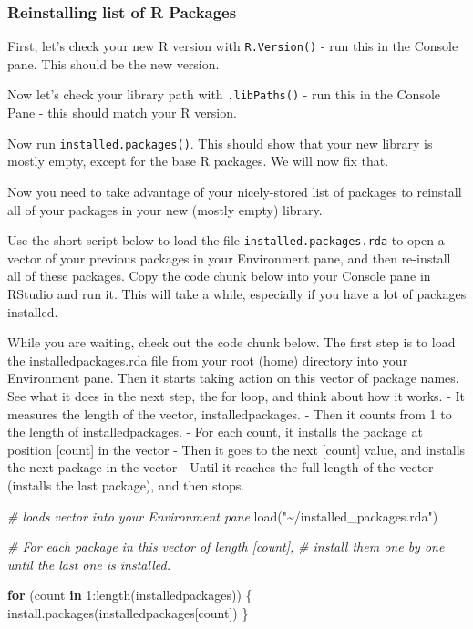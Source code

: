 \documentclass[
]{book}
\newenvironment{Shaded}{\begin{snugshade}}{\end{snugshade}}
\newcommand{\CommentTok}[1]{\textcolor[rgb]{0.56,0.35,0.01}{\textit{#1}}}
\newcommand{\ControlFlowTok}[1]{\textcolor[rgb]{0.13,0.29,0.53}{\textbf{#1}}}
\newcommand{\DecValTok}[1]{\textcolor[rgb]{0.00,0.00,0.81}{#1}}
\newcommand{\FunctionTok}[1]{\textcolor[rgb]{0.00,0.00,0.00}{#1}}
\newcommand{\NormalTok}[1]{#1}
\newcommand{\SpecialCharTok}[1]{\textcolor[rgb]{0.00,0.00,0.00}{#1}}
\newcommand{\StringTok}[1]{\textcolor[rgb]{0.31,0.60,0.02}{#1}}
\begin{document}
\hypertarget{reinstalling-list-of-r-packages}{%
\subsubsection{Reinstalling list of R Packages}\label{reinstalling-list-of-r-packages}}

First, let's check your new R version with \texttt{R.Version()} - run this in the Console pane. This should be the new version.

Now let's check your library path with \texttt{.libPaths()} - run this in the Console Pane - this should match your R version.

Now run \texttt{installed.packages()}. This should show that your new library is mostly empty, except for the base R packages. We will now fix that.

Now you need to take advantage of your nicely-stored list of packages to reinstall all of your packages in your new (mostly empty) library.

Use the short script below to load the file \texttt{installed.packages.rda} to open a vector of your previous packages in your Environment pane, and then re-install all of these packages. Copy the code chunk below into your Console pane in RStudio and run it. This will take a while, especially if you have a lot of packages installed.

While you are waiting, check out the code chunk below. The first step is to load the installedpackages.rda file from your root (home) directory into your Environment pane. Then it starts taking action on this vector of package names. See what it does in the next step, the for loop, and think about how it works. - It measures the length of the vector, installedpackages. - Then it counts from 1 to the length of installedpackages. - For each count, it installs the package at position {[}count{]} in the vector - Then it goes to the next {[}count{]} value, and installs the next package in the vector - Until it reaches the full length of the vector (installs the last package), and then stops.

\begin{Shaded}
\begin{Highlighting}[]
\CommentTok{\# loads vector into your Environment pane}
\FunctionTok{load}\NormalTok{(}\StringTok{"\textasciitilde{}/installed\_packages.rda"}\NormalTok{)}

\CommentTok{\# For each package in this vector of length [count],}
\CommentTok{\# install them one by one until the last one is installed.}

\ControlFlowTok{for}\NormalTok{ (count }\ControlFlowTok{in} \DecValTok{1}\SpecialCharTok{:}\FunctionTok{length}\NormalTok{(installedpackages)) \{}
    \FunctionTok{install.packages}\NormalTok{(installedpackages[count])}
\NormalTok{\}}
\end{Highlighting}
\end{Shaded}
\end{document}
